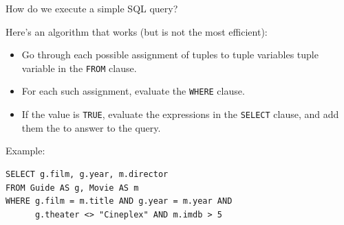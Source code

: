 \documentclass[xcolor={usenames,dvipsnames}]{beamer}
\begin{document}
\begin{frame}[fragile]{How do we execute a simple SQL query?}

Here's an algorithm that works (but is not the most efficient):

\begin{itemize}[-]
\item Go through each possible assignment of tuples to tuple variables tuple variable in the \lstinline[style=SQL]{FROM} clause.
\item For each such assignment, evaluate the \lstinline[style=SQL]{WHERE} clause.
\item If the value is \lstinline[style=SQL]{TRUE}, evaluate the expressions in the \lstinline[style=SQL]{SELECT} clause, and add them the to answer to the query.
\end{itemize}


Example:

\begin{lstlisting}[style=SQL]
SELECT g.film, g.year, m.director
FROM Guide AS g, Movie AS m
WHERE g.film = m.title AND g.year = m.year AND
      g.theater <> "Cineplex" AND m.imdb > 5 
\end{lstlisting}      



\end{frame}

\def\TableExpressions{\mathcal{T}}
\def\ValueExpressions{\mathcal{V}}
\def\Predicates{\mathcal{P}}
\def\VE{\mathit{ve}}
\def\TE{\mathit{te}}

%
%
\end{document}
